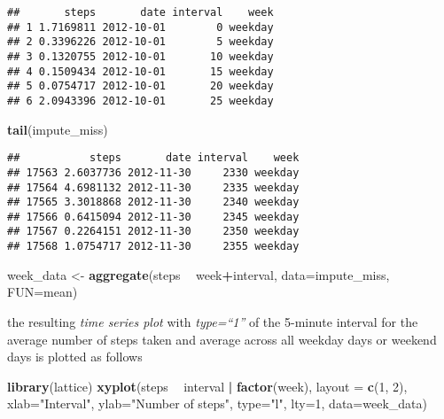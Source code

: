 \documentclass[]{article}
\newenvironment{Shaded}{\begin{snugshade}}{\end{snugshade}}
\newcommand{\KeywordTok}[1]{\textcolor[rgb]{0.13,0.29,0.53}{\textbf{#1}}}
\newcommand{\DataTypeTok}[1]{\textcolor[rgb]{0.13,0.29,0.53}{#1}}
\newcommand{\DecValTok}[1]{\textcolor[rgb]{0.00,0.00,0.81}{#1}}
\newcommand{\StringTok}[1]{\textcolor[rgb]{0.31,0.60,0.02}{#1}}
\newcommand{\OperatorTok}[1]{\textcolor[rgb]{0.81,0.36,0.00}{\textbf{#1}}}
\newcommand{\NormalTok}[1]{#1}
\begin{document}
\begin{verbatim}
##       steps       date interval    week
## 1 1.7169811 2012-10-01        0 weekday
## 2 0.3396226 2012-10-01        5 weekday
## 3 0.1320755 2012-10-01       10 weekday
## 4 0.1509434 2012-10-01       15 weekday
## 5 0.0754717 2012-10-01       20 weekday
## 6 2.0943396 2012-10-01       25 weekday
\end{verbatim}

\begin{Shaded}
\begin{Highlighting}[]
\KeywordTok{tail}\NormalTok{(impute_miss)}
\end{Highlighting}
\end{Shaded}

\begin{verbatim}
##           steps       date interval    week
## 17563 2.6037736 2012-11-30     2330 weekday
## 17564 4.6981132 2012-11-30     2335 weekday
## 17565 3.3018868 2012-11-30     2340 weekday
## 17566 0.6415094 2012-11-30     2345 weekday
## 17567 0.2264151 2012-11-30     2350 weekday
## 17568 1.0754717 2012-11-30     2355 weekday
\end{verbatim}

\begin{Shaded}
\begin{Highlighting}[]
\NormalTok{week_data <-}\StringTok{ }\KeywordTok{aggregate}\NormalTok{(steps }\OperatorTok{~}\StringTok{ }\NormalTok{week}\OperatorTok{+}\NormalTok{interval, }\DataTypeTok{data=}\NormalTok{impute_miss, }\DataTypeTok{FUN=}\NormalTok{mean)}
\end{Highlighting}
\end{Shaded}

the resulting \emph{time series plot} with \emph{type=``1''} of the
5-minute interval for the average number of steps taken and average
across all weekday days or weekend days is plotted as follows

\begin{Shaded}
\begin{Highlighting}[]
\KeywordTok{library}\NormalTok{(lattice)}
\KeywordTok{xyplot}\NormalTok{(steps }\OperatorTok{~}\StringTok{ }\NormalTok{interval }\OperatorTok{|}\StringTok{ }\KeywordTok{factor}\NormalTok{(week),}
       \DataTypeTok{layout =} \KeywordTok{c}\NormalTok{(}\DecValTok{1}\NormalTok{, }\DecValTok{2}\NormalTok{),}
       \DataTypeTok{xlab=}\StringTok{"Interval"}\NormalTok{,}
       \DataTypeTok{ylab=}\StringTok{"Number of steps"}\NormalTok{,}
       \DataTypeTok{type=}\StringTok{"l"}\NormalTok{,}
       \DataTypeTok{lty=}\DecValTok{1}\NormalTok{,}
       \DataTypeTok{data=}\NormalTok{week_data)}
\end{Highlighting}
\end{Shaded}
\end{document}
